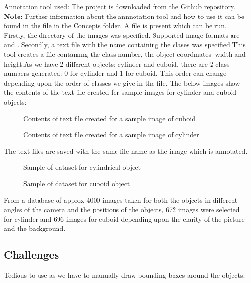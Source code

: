 Annotation tool used: The project   
is downloaded from the Github repository.\cite{Kwon:2021}
\textbf{Note: }Further information about the annnotation tool and how to use it can be found in the file in the Concepts folder. 
A  file is present which can be run. Firstly, the directory of the images was specified.
Supported image formats are  and . Secondly, a text file with the name  containing the clases was specified
This tool creates a  file containing the class number, the object coordinates, width and height.As we have 2 different objects: cylinder and cuboid, there are 2 class numbers generated: 0 for cylinder and 1 for cuboid. This order can change depending upon the order of classes we give in the  file. 
The below images show the contents of the text file created for sample images for cylinder and cuboid objects: 

\begin{figure}[H]
	\centering
	\caption{Contents of text file created for a sample image of cuboid}
\end{figure}

\begin{figure}[H]
	\centering
	\caption{Contents of text file created for a sample image of cylinder}
\end{figure}

The text files are saved with the same file name as the image which is annotated.

\begin{figure}[H]
	\centering
	\caption{Sample of dataset for cylindrical object}
\end{figure}

\begin{figure}[H]
	\centering
	\caption{Sample of dataset for cuboid object}
\end{figure}

From a database of approx 4000 images taken for both the objects in different angles of the camera and the positions of the objects, 672 images were selected for cylinder and 696 images for cuboid depending upon the clarity of the picture and the background.

\subsection{Challenges}

Tedious to use as we have to manually draw bounding boxes around the objects.

